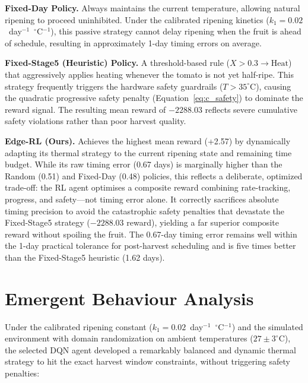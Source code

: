     \textbf{Fixed-Day Policy.} Always maintains the current temperature, allowing natural ripening to proceed uninhibited. Under the calibrated ripening kinetics ($k_1 = 0.02$~day$^{-1}$~$^{\circ}$C$^{-1}$), this passive strategy cannot delay ripening when the fruit is ahead of schedule, resulting in approximately 1-day timing errors on average.

    \textbf{Fixed-Stage5 (Heuristic) Policy.} A threshold-based rule ($X > 0.3 \to \text{Heat}$) that aggressively applies heating whenever the tomato is not yet half-ripe. This strategy frequently triggers the hardware safety guardrails ($T > 35^{\circ}$C), causing the quadratic progressive safety penalty (Equation~\ref{eq:c_safety}) to dominate the reward signal. The resulting mean reward of $-2288.03$ reflects severe cumulative safety violations rather than poor harvest quality.

    \textbf{Edge-RL (Ours).} Achieves the highest mean reward (+2.57) by dynamically adapting its thermal strategy to the current ripening state and remaining time budget. While its raw timing error (0.67 days) is marginally higher than the Random (0.51) and Fixed-Day (0.48) policies, this reflects a deliberate, optimized trade-off: the RL agent optimises a composite reward combining rate-tracking, progress, and safety---not timing error alone. It correctly sacrifices absolute timing precision to avoid the catastrophic safety penalties that devastate the Fixed-Stage5 strategy ($-2288.03$ reward), yielding a far superior composite reward without spoiling the fruit. The 0.67-day timing error remains well within the 1-day practical tolerance for post-harvest scheduling and is five times better than the Fixed-Stage5 heuristic (1.62 days).



\section{Emergent Behaviour Analysis}
    \label{sec:Emergent Behaviour}

    Under the calibrated ripening constant ($k_1 = 0.02$~day$^{-1}$~$^{\circ}$C$^{-1}$) and the simulated environment with domain randomization on ambient temperatures ($27 \pm 3^{\circ}$C), the selected DQN agent developed a remarkably balanced and dynamic thermal strategy to hit the exact harvest window constraints, without triggering safety penalties:

